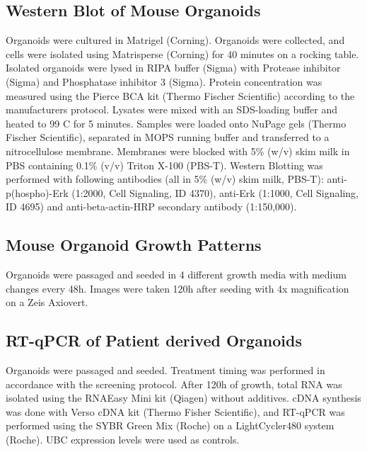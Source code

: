 \begin{flushleft}
\subsection{Western Blot of Mouse Organoids}
Organoids were cultured in Matrigel (Corning). Organoids were collected, and cells were isolated using Matrisperse (Corning) for 40 minutes on a rocking table. Isolated organoids were lysed in RIPA buffer (Sigma) with Protease inhibitor (Sigma) and Phosphatase inhibitor 3 (Sigma). Protein concentration was measured using the Pierce BCA kit (Thermo Fischer Scientific) according to the manufacturers protocol. Lysates were mixed with an SDS-loading buffer and heated to 99 C for 5 minutes. Samples were loaded onto NuPage gels (Thermo Fischer Scientific), separated in MOPS running buffer and transferred to a nitrocellulose membrane. Membranes were blocked with 5\% (w/v) skim milk in PBS containing 0.1\% (v/v) Triton X-100 (PBS-T). Western Blotting was performed with following antibodies (all in 5\% (w/v) skim milk, PBS-T): anti-p(hospho)-Erk (1:2000, Cell Signaling, ID 4370), anti-Erk (1:1000, Cell Signaling, ID 4695) and anti-beta-actin-HRP secondary antibody (1:150,000).

\subsection{Mouse Organoid Growth Patterns}
Organoids were passaged and seeded in 4 different growth media with medium changes every 48h. Images were taken 120h after seeding with 4x magnification on a Zeis Axiovert. 

\subsection{RT-qPCR of Patient derived Organoids}
Organoids were passaged and seeded. Treatment timing was performed in accordance with the screening protocol. After 120h of growth, total RNA was isolated using the RNAEasy Mini kit (Qiagen) without additives. cDNA synthesis was done with Verso cDNA kit (Thermo Fisher Scientific), and RT-qPCR was performed using the SYBR Green Mix (Roche) on a LightCycler480 system (Roche). UBC expression levels were used as controls.


\end{flushleft}
